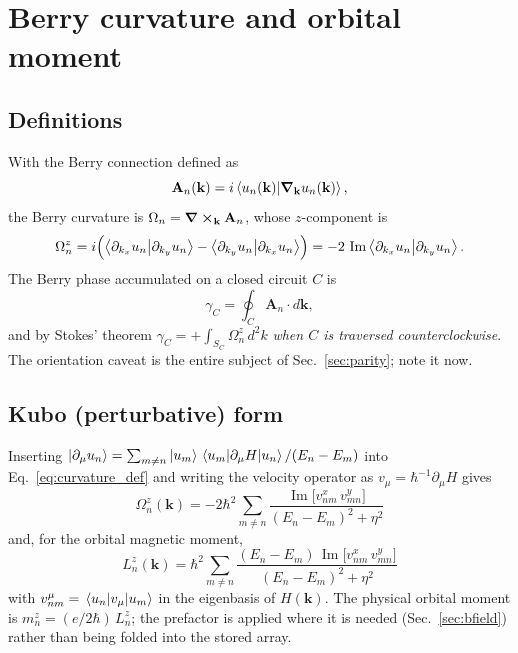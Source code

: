 \documentclass[11pt]{article}
\newcommand{\Imag}{\operatorname{Im}}
\newcommand{\kb}{\mathbf{k}}
\newcommand{\Om}{\Omega}
\begin{document}
\section{Berry curvature and orbital moment}\label{sec:bc}

\subsection{Definitions}

With the Berry connection defined as
\begin{equation}\label{eq:connection}
  \mathbf{A}_n(\kb) = i\braket{u_n(\kb)}{\grad_\kb u_n(\kb)},
\end{equation}
the Berry curvature is $\Om_n = \curl_\kb \mathbf{A}_n$, whose
$z$-component is
\begin{equation}\label{eq:curvature_def}
  \Om_n^z
  = i\Bigl( \braket{\partial_{k_x} u_n}{\partial_{k_y} u_n}
          - \braket{\partial_{k_y} u_n}{\partial_{k_x} u_n} \Bigr)
  = -2\,\Imag \braket{\partial_{k_x} u_n}{\partial_{k_y} u_n}.
\end{equation}
The Berry phase accumulated on a closed circuit $C$ is
\begin{equation}\label{eq:berryphase}
  \gamma_C = \oint_C \mathbf{A}_n \cdot d\kb ,
\end{equation}
and by Stokes' theorem $\gamma_C = +\int_{S_C} \Om_n^z\, d^2k$
\emph{when $C$ is traversed counterclockwise}.  The orientation caveat is
the entire subject of Sec.~\ref{sec:parity}; note it now.

\subsection{Kubo (perturbative) form}

Inserting $\ket{\partial_\mu u_n} = \sum_{m\neq n}
\ket{u_m}\mel{u_m}{\partial_\mu H}{u_n}/(E_n - E_m)$ into
Eq.~\eqref{eq:curvature_def} and writing the velocity operator as
$v_\mu = \hbar^{-1}\partial_\mu H$ gives
\begin{equation}\label{eq:Oz_kubo}
  \boxed{\;
  \Om_n^z(\kb) = -2\hbar^2 \sum_{m \neq n}
  \frac{\Imag\bigl[ v^x_{nm}\, v^y_{mn} \bigr]}
       {(E_n - E_m)^2 + \eta^2}
  \;}
\end{equation}
and, for the orbital magnetic moment,
\begin{equation}\label{eq:Lz_kubo}
  \boxed{\;
  L_n^z(\kb) = \hbar^2 \sum_{m \neq n}
  \frac{(E_n - E_m)\,\Imag\bigl[ v^x_{nm}\, v^y_{mn} \bigr]}
       {(E_n - E_m)^2 + \eta^2}
  \;}
\end{equation}
with $v^\mu_{nm} = \mel{u_n}{v_\mu}{u_m}$ in the eigenbasis of
$H(\kb)$.  The physical orbital moment is
$m_n^z = (e/2\hbar)\,L_n^z$; the prefactor is applied where it is needed
(Sec.~\ref{sec:bfield}) rather than being folded into the stored array.
\end{document}
